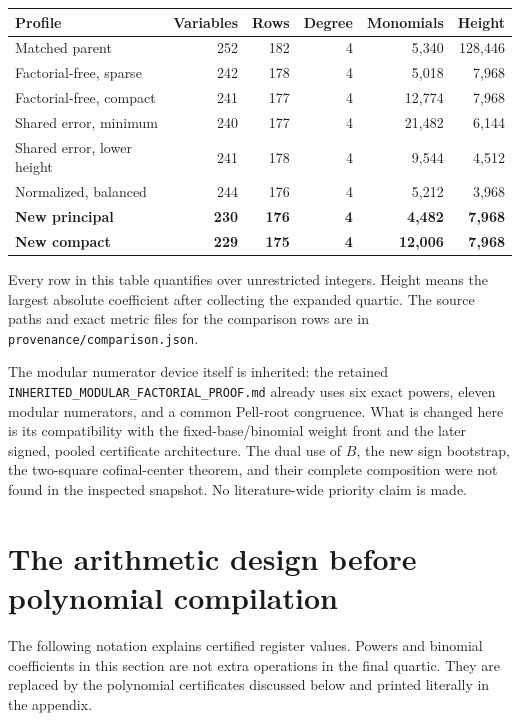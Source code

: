 \documentclass[11pt]{article}
\theoremstyle{remark}\newtheorem{remark}[theorem]{Remark}
\begin{document}
\begin{center}\small
\begin{tabular}{@{}lrrrrr@{}}
\toprule
Profile & Variables & Rows & Degree & Monomials & Height \\
\midrule
Matched parent & 252 & 182 & 4 & 5,340 & 128,446 \\
Factorial-free, sparse & 242 & 178 & 4 & 5,018 & 7,968 \\
Factorial-free, compact & 241 & 177 & 4 & 12,774 & 7,968 \\
Shared error, minimum & 240 & 177 & 4 & 21,482 & 6,144 \\
Shared error, lower height & 241 & 178 & 4 & 9,544 & 4,512 \\
Normalized, balanced & 244 & 176 & 4 & 5,212 & 3,968 \\
\midrule
\textbf{New principal} & \textbf{230} & \textbf{176} & \textbf{4} & \textbf{4,482} & \textbf{7,968} \\
\textbf{New compact} & \textbf{229} & \textbf{175} & \textbf{4} & \textbf{12,006} & \textbf{7,968} \\
\bottomrule
\end{tabular}
\end{center}
Every row in this table quantifies over unrestricted integers.
Height means the largest absolute coefficient after collecting the expanded quartic.
The source paths and exact metric files for the comparison rows are in \nolinkurl{provenance/comparison.json}.

The modular numerator device itself is inherited: the retained
\nolinkurl{INHERITED_MODULAR_FACTORIAL_PROOF.md} already uses six exact
powers, eleven modular numerators, and a common Pell-root congruence.
What is changed here is its compatibility with the fixed-base/binomial
weight front and the later signed, pooled certificate architecture.
The dual use of $B$, the new sign bootstrap, the two-square cofinal-center
theorem, and their complete composition were not found in the inspected
snapshot. No literature-wide priority claim is made.

\section{The arithmetic design before polynomial compilation}

The following notation explains certified register values. Powers and
binomial coefficients in this section are not extra operations in the
final quartic. They are replaced by the polynomial certificates discussed
below and printed literally in the appendix.
\end{document}
